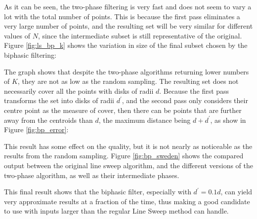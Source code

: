 

As it can be seen, the two-phase filtering is very fast and does not seem to vary a lot with the total number of points. This is because the first pass eliminates a very large number of points, and the resulting set will be very similar for different values of $N$, since the intermediate subset is still representative of the original. Figure \ref{fig:ls_bp_k} shows the variation in size of the final subset chosen by the biphasic filtering:



The graph shows that despite the two-phase algorithms returning lower numbers of $K$, they are not as low as the random sampling. The resulting set does not necessarily cover all the points with disks of radii $d$. Because the first pass transforms the set into disks of radii $d^\prime$, and the second pass only considers their centre point as the measure of cover, then there can be points that are further away from the centroids than $d$, the maximum distance being $d+d^\prime$, as show in Figure \ref{fig:bp_error}:



This result has some effect on the quality, but it is not nearly as noticeable as the results from the random sampling. Figure \ref{fig:bp_sweden} shows the compared output between the original line sweep algorithm, and the different versions of the two-phase algorithm, as well as their intermediate phases.



This final result shows that the biphasic filter, especially with $d^\prime=0.1d$, can yield very approximate results at a fraction of the time, thus making a good candidate to use with inputs larger than the regular Line Sweep method can handle.